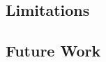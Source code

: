 \documentclass[11pt]{article}
\begin{document}
\subsection{Limitations}



\subsection{Future Work}




\cite{scholak2021picard}

\cite{wolf2020huggingfaces}

\cite{yu2019spider}

\cite{misc_movie_132}






\end{document}
